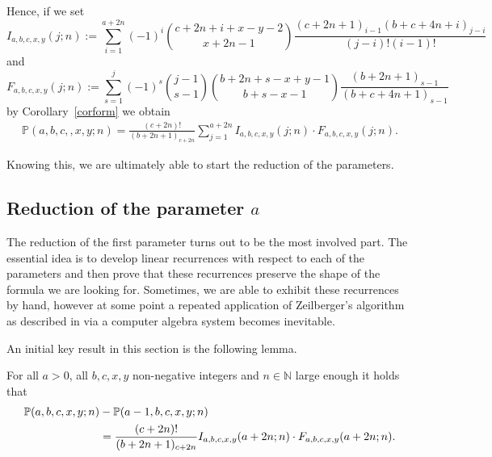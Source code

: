 \documentclass{amsart}
\numberwithin{equation}{section}
\newcommand*{\N}{\mathbb{N}}
\begin{document}
Hence, if we set
\[I_{a,b,c,x,y}(j;n):=\sum_{i=1}^{a+2n}(-1)^{i}\binom{c+2n+i+x-y-2}{x+2n-1}\frac{(c+2n+1)_{i-1}(b+c+4n+i)_{j-i}}{(j-i)!(i-1)!}\] 
and
\[F_{a,b,c,x,y}(j;n):=\sum_{s=1}^{j} (-1)^s\binom{j-1}{s-1}\binom{b+2n+s-x+y-1}{b+s-x-1}\frac{(b+2n+1)_{s-1}}{(b+c+4n+1)_{s-1}}\]
by Corollary~\ref{corform} we obtain
\begin{align}
    \mathbb{P}(a,b,c,,x,y;n)=\frac{(c+2n)!}{(b+2n+1)_{c+2n}}\sum_{j=1}^{a+2n} I_{a,b,c,x,y}(j;n)\cdot F_{a,b,c,x,y}(j;n). \label{IFform}
\end{align}

Knowing this, we are ultimately able to start the reduction of the parameters.

\subsection{Reduction of the parameter $a$}
The reduction of the first parameter turns out to be the most involved part. The essential idea is to develop linear recurrences with respect to each of the parameters and then prove that these recurrences preserve the shape of the formula we are looking for. Sometimes, we are able to exhibit these recurrences by hand, however at some point a repeated application of Zeilberger's algorithm as described in \cite{AB} via a computer algebra system becomes inevitable. 

An initial key result in this section is the following lemma.

\begin{lem}\label{redA}
    For all $a>0$, all $b,c,x,y$ non-negative integers and $n\in\N$ large enough it holds that
    \begin{align}
        \mathbb{P}(a,b,c,x,y;n)&-\mathbb{P}(a-1,b,c,x,y;n)\notag\\
        &=\frac{(c+2n)!}{(b+2n+1)_{c+2n}}I_{a,b,c,x,y}(a+2n;n)\cdot F_{a,b,c,x,y}(a+2n;n).\notag
    \end{align}
\end{lem}
\end{document}

